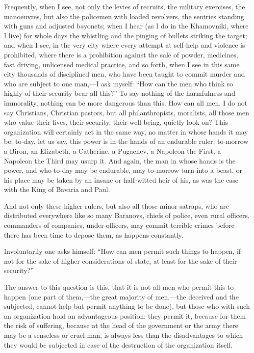\documentclass{book}
\begin{document}
Frequently, when I see, not only the levies of recruits, the military exercises, the manoeuvres, but also the policemen with loaded revolvers, the sentries standing with guns and adjusted bayonets; when I hear (as I do in the Khamovniki, where I live) for whole days the whistling and the pinging of bullets striking the target; and when I see, in the very city where every attempt at self-help and violence is prohibited, where there is a prohibition against the sale of powder, medicines, fast driving, unlicensed medical practice, and so forth, when I see in this same city thousands of disciplined men, who have been taught to commit murder and who are subject to one man,—I ask myself: “How can the men who think so highly of their security bear all this?” To say nothing of the harmfulness and immorality, nothing can be more dangerous than this. How can all men, I do not say Christians, Christian pastors, but all philanthropists, moralists, all those men who value their lives, their security, their well-being, quietly look on? This organization will certainly act in the same way, no matter in whose hands it may be: to-day, let us say, this power is in the hands of an endurable ruler; to-morrow a Biron, an Elizabeth, a Catherine, a Pugachev, a Napoleon the First, a Napoleon the Third may usurp it. And again, the man in whose hands is the power, and who to-day may be endurable, may to-morrow turn into a beast, or his place may be taken by an insane or half-witted heir of his, as was the case with the King of Bavaria and Paul.

And not only these higher rulers, but also all those minor satraps, who are distributed everywhere like so many Baranovs, chiefs of police, even rural officers, commanders of companies, under-officers, may commit terrible crimes before there has been time to depose them, as happens constantly.

Involuntarily one asks himself: “How can men permit such things to happen, if not for the sake of higher considerations of state, at least for the sake of their security?”

The answer to this question is this, that it is not all men who permit this to happen (one part of them,—the great majority of men,—the deceived and the subjected, cannot help but permit anything to be done), but those who with such an organization hold an advantageous position; they permit it, because for them the risk of suffering, because at the head of the government or the army there may be a senseless or cruel man, is always less than the disadvantages to which they would be subjected in case of the destruction of the organization itself.
\end{document}
